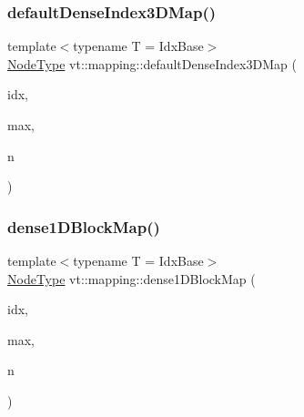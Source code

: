 \mbox{\label{namespacevt_1_1mapping_a776a69138a1fbceab5bbf10b9c07a858}} 
\subsubsection{\texorpdfstring{default\+Dense\+Index3\+D\+Map()}{defaultDenseIndex3DMap()}}
{\footnotesize\ttfamily template$<$typename T  = Idx\+Base$>$ \\
\hyperlink{namespacevt_a866da9d0efc19c0a1ce79e9e492f47e2}{Node\+Type} vt\+::mapping\+::default\+Dense\+Index3\+D\+Map (\begin{DoxyParamCaption}\item[{\hyperlink{namespacevt_1_1mapping_aacc737158b6517f2d760ffc8d1b5abca}{Idx3\+D\+Ptr}$<$ T $>$}]{idx,  }\item[{\hyperlink{namespacevt_1_1mapping_aacc737158b6517f2d760ffc8d1b5abca}{Idx3\+D\+Ptr}$<$ T $>$}]{max,  }\item[{\hyperlink{namespacevt_a866da9d0efc19c0a1ce79e9e492f47e2}{Node\+Type}}]{n }\end{DoxyParamCaption})}

\mbox{\label{namespacevt_1_1mapping_a2d49151f03d4ce393b01c620f6b18517}} 
\subsubsection{\texorpdfstring{dense1\+D\+Block\+Map()}{dense1DBlockMap()}}
{\footnotesize\ttfamily template$<$typename T  = Idx\+Base$>$ \\
\hyperlink{namespacevt_a866da9d0efc19c0a1ce79e9e492f47e2}{Node\+Type} vt\+::mapping\+::dense1\+D\+Block\+Map (\begin{DoxyParamCaption}\item[{\hyperlink{namespacevt_1_1mapping_a8b576cf2f31069778e4951f64bccafd8}{Idx1\+D\+Ptr}$<$ T $>$}]{idx,  }\item[{\hyperlink{namespacevt_1_1mapping_a8b576cf2f31069778e4951f64bccafd8}{Idx1\+D\+Ptr}$<$ T $>$}]{max,  }\item[{\hyperlink{namespacevt_a866da9d0efc19c0a1ce79e9e492f47e2}{Node\+Type}}]{n }\end{DoxyParamCaption})}

